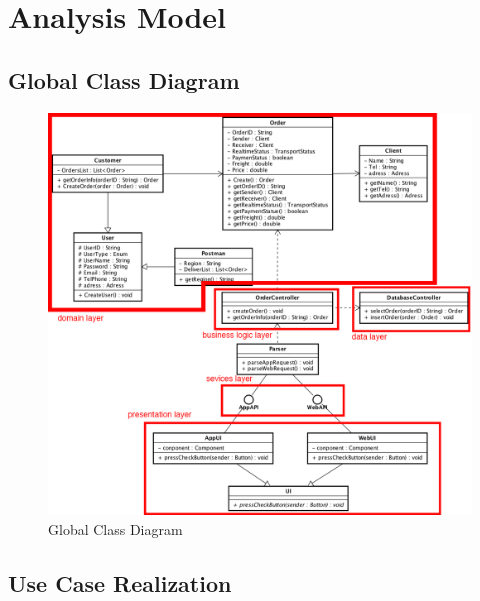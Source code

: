 \documentclass[12pt]{scrreprt}
\begin{document}
\section{Analysis Model}
\subsection{Global Class Diagram}
\begin{figure}[H]
  \centering\includegraphics[width=6in]{DocumentRes/ClassDiagram.png}
  \caption{Global Class Diagram}
\end{figure}

\subsection{Use Case Realization}
\end{document}
